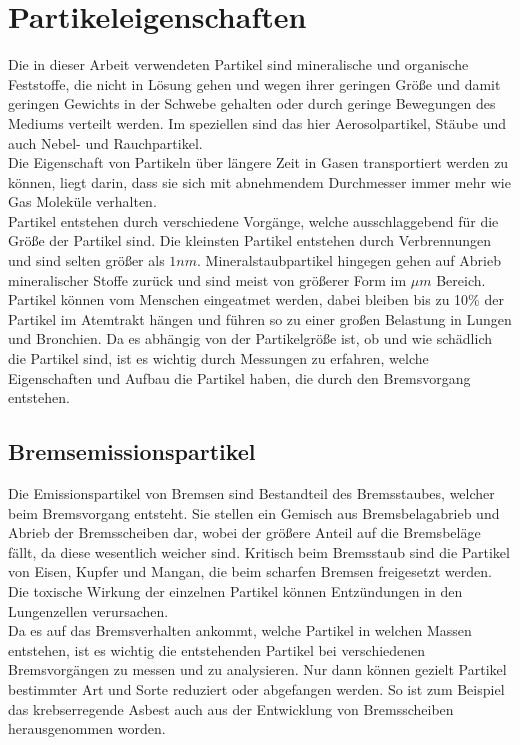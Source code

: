 \section{Partikeleigenschaften}
Die in dieser Arbeit verwendeten Partikel sind mineralische und organische Feststoffe, die nicht in L\"{o}sung gehen und wegen ihrer geringen Gr\"{o}{\ss}e und damit geringen Gewichts in der Schwebe gehalten oder durch geringe Bewegungen des Mediums verteilt werden. Im speziellen sind das hier Aerosolpartikel, St\"{a}ube und auch Nebel- und Rauchpartikel.\\
Die Eigenschaft von Partikeln \"{u}ber l\"{a}ngere Zeit in Gasen transportiert werden zu k\"{o}nnen, liegt darin, dass sie sich mit abnehmendem Durchmesser immer mehr wie Gas Molek\"{u}le verhalten.\\
Partikel entstehen durch verschiedene Vorg\"{a}nge, welche ausschlaggebend f\"{u}r die Gr\"{o}{\ss}e der Partikel sind. Die kleinsten Partikel entstehen durch Verbrennungen und sind selten gr\"{o}{\ss}er als \(1 nm\). Mineralstaubpartikel hingegen gehen auf Abrieb mineralischer Stoffe zur\"{u}ck und sind meist von gr\"{o}{\ss}erer Form im \(\mu m\) Bereich.\\
Partikel k\"{o}nnen vom Menschen eingeatmet werden, dabei bleiben bis zu 10\% der Partikel im Atemtrakt h\"{a}ngen und f\"{u}hren so zu einer gro{\ss}en Belastung in Lungen und Bronchien. Da es abh\"{a}ngig von der Partikelgr\"{o}{\ss}e ist, ob und wie sch\"{a}dlich die Partikel sind, ist es wichtig durch Messungen zu erfahren, welche Eigenschaften und Aufbau die Partikel haben, die durch den Bremsvorgang entstehen\cite{reinraumtechnik}.
\newpage

\subsection{Bremsemissionspartikel}
Die Emissionspartikel von Bremsen  sind Bestandteil des Bremsstaubes, welcher beim Bremsvorgang entsteht. Sie stellen ein Gemisch aus Bremsbelagabrieb und Abrieb der Bremsscheiben dar, wobei der gr\"{o}{\ss}ere Anteil auf die Bremsbel\"{a}ge f\"{a}llt, da diese wesentlich weicher sind. Kritisch beim Bremsstaub sind die Partikel von Eisen, Kupfer und Mangan, die beim scharfen Bremsen freigesetzt werden. Die toxische Wirkung der einzelnen Partikel k\"{o}nnen Entz\"{u}ndungen in den Lungenzellen verursachen.\\
Da es auf das Bremsverhalten ankommt, welche Partikel in welchen Massen entstehen, ist es wichtig die entstehenden Partikel bei verschiedenen Bremsvorg\"{a}ngen zu messen und zu analysieren. Nur dann k\"{o}nnen gezielt Partikel bestimmter Art und Sorte reduziert oder abgefangen werden. So ist zum Beispiel das krebserregende Asbest auch aus der Entwicklung von Bremsscheiben herausgenommen worden\cite{envyl}.

